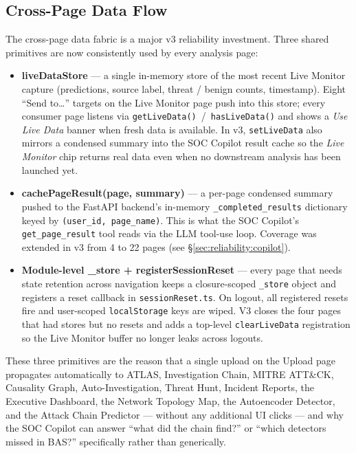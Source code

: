 \documentclass[11pt,a4paper]{article}
\begin{document}
\subsection{Cross-Page Data Flow}
The cross-page data fabric is a major v3 reliability investment.  Three
shared primitives are now consistently used by every analysis page:

\begin{itemize}[leftmargin=*,nosep]
  \item \textbf{liveDataStore} --- a single in-memory store of the most
        recent Live Monitor capture (predictions, source label, threat
        / benign counts, timestamp).  Eight ``Send to\dots'' targets on
        the Live Monitor page push into this store; every consumer page
        listens via \texttt{getLiveData()}~/~\texttt{hasLiveData()} and
        shows a \emph{Use Live Data} banner when fresh data is
        available.  In v3, \texttt{setLiveData} also mirrors a
        condensed summary into the SOC Copilot result cache so the
        \emph{Live Monitor} chip returns real data even when no
        downstream analysis has been launched yet.
  \item \textbf{cachePageResult(page, summary)} --- a per-page condensed
        summary pushed to the FastAPI backend's in-memory
        \texttt{\_completed\_results} dictionary keyed by
        \texttt{(user\_id, page\_name)}.  This is what the SOC Copilot's
        \texttt{get\_page\_result} tool reads via the LLM tool-use loop.
        Coverage was extended in v3 from 4 to 22 pages (see
        \S\ref{sec:reliability:copilot}).
  \item \textbf{Module-level \_store + registerSessionReset} --- every
        page that needs state retention across navigation keeps a
        closure-scoped \texttt{\_store} object and registers a reset
        callback in \texttt{sessionReset.ts}.  On logout, all
        registered resets fire and user-scoped \texttt{localStorage}
        keys are wiped.  V3 closes the four pages that had stores but
        no resets and adds a top-level \texttt{clearLiveData} registration
        so the Live Monitor buffer no longer leaks across logouts.
\end{itemize}

These three primitives are the reason that a single upload on the
Upload page propagates automatically to ATLAS, Investigation Chain,
MITRE ATT\&CK, Causality Graph, Auto-Investigation, Threat Hunt,
Incident Reports, the Executive Dashboard, the Network Topology Map,
the Autoencoder Detector, and the Attack Chain Predictor --- without
any additional UI clicks --- and why the SOC Copilot can answer
``what did the chain find?'' or ``which detectors missed in BAS?''
specifically rather than generically.
\end{document}
